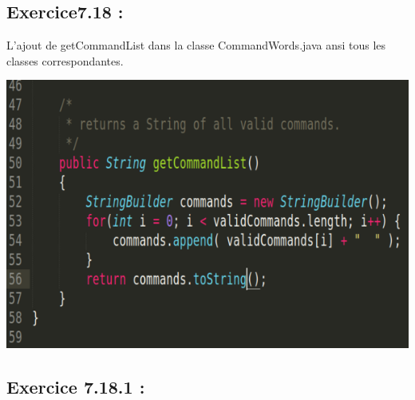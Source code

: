 \documentclass[french,10pt,a4paper]{report}
\begin{document}
\subsection{\textcolor{bb}{Exercice7.18 :}}
L’ajout de getCommandList dans la classe CommandWords.java ansi tous les classes correspondantes.
\begin{center}
	\includegraphics[scale=0.3]{captures/it2_1.png}
\end{center}

\subsection{\textcolor{bb}{Exercice 7.18.1 :}}
\end{document}
